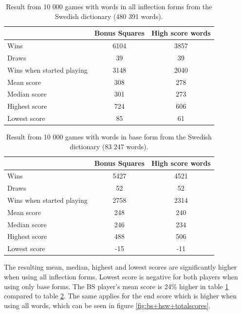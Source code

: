 \documentclass[a4paper, 12pt]{report}
\begin{document}
\begin{table}[h]
\centering
    \begin{tabular}{ l | c | c }
   	& Bonus Squares & High score words \\
   	\hline
   	Wins & 6104 & 3857 \\
   	Draws & 39 & 39 \\   	
	Wins when started playing & 3148 & 2040 \\   	
	Mean score & 308 & 278 \\
	Median score & 301 & 273 \\	 	 
	Highest score & 724 & 606 \\
	Lowest score & 85 & 61 \\		
    \end{tabular}
\caption{Result from 10 000 games with words in all inflection forms from the Swedish dictionary (480 391 words).}
\label{table:bs+hsw+allwords}
\end{table}

\begin{table}[h]
\centering
    \begin{tabular}{ l | c | c }
   	& Bonus Squares & High score words \\
   	\hline
   	Wins & 5427 & 4521 \\
   	Draws & 52 & 52 \\
	Wins when started playing & 2758 & 2314 \\   	
	Mean score & 248 & 240 \\
	Median score & 246 & 234 \\	 	 
	Highest score & 488 & 506 \\
	Lowest score & -15 & -11 \\		
    \end{tabular}
\caption{Result from 10 000 games with words in base form from the Swedish dictionary (83 247 words).}
\label{table:bs+hsw+baseforms}
\end{table}

The resulting mean, median, highest and lowest scores are significantly higher when using all inflection forms. Lowest score is negative for both players when using only base forms. The BS player's mean score is 24\% higher in table \ref{table:bs+hsw+allwords} compared to table \ref{table:bs+hsw+baseforms}. The same applies for the end score which is higher when using all words, which can be seen in figure \ref{fig:bs+hsw+totalscores}.
\end{document}
